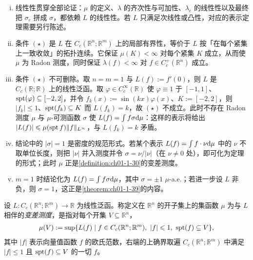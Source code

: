 \documentclass[../../main.tex]{subfiles}%
\begin{document}
\begin{remark}\label{remark:ch01-thm-1-38-条件}
\begin{enumerate}[(i)]
\item 线性性贯穿全部论证：$\mu$ 的定义、$\lambda$ 的齐次性与可加性、$\lambda_e$ 的线性性以及最终把 $\sigma_e$ 拼成 $\sigma$，都依赖 $L$ 的线性性。若 $L$ 只满足次线性或凸性，对应的表示定理需要另行陈述。
\item 条件 $(\star)$ 是 $L$ 在 $C_c(\mathbb{R}^n;\mathbb{R}^m)$ 上的局部有界性，等价于 $L$ 按「在每个紧集上一致收敛」的拓扑连续。它保证 $\mu(K)<\infty$ 对每个紧集 $K$ 成立，从而使 $\mu$ 为 Radon 测度，同时保证 $\lambda(f)<\infty$ 对 $f\in C_c^+(\mathbb{R}^n)$ 成立。
\item 条件 $(\star)$ 不可删除。取 $n=m=1$ 与 $L(f):=f'(0)$，则 $L$ 是 $C_c(\mathbb{R};\mathbb{R})$ 上的线性泛函。取 $\varphi\in C_c^{\infty}(\mathbb{R})$ 使 $\varphi\equiv1$ 于 $[-1,1]$、$\operatorname{spt}(\varphi)\subseteq[-2,2]$，并令 $f_k(x):=\sin(kx)\varphi(x)$、$K:=[-2,2]$，则 $\lvert f_k\rvert\leqslant1$、$\operatorname{spt}(f_k)\subseteq K$ 而 $L(f_k)=k$，故 $(\star)$ 不成立。此时不存在 Radon 测度 $\mu$ 与 $\mu$-可测函数 $\sigma$ 使 $L(f)=\int f\sigma\mathrm{d}\mu$：这样的表示将给出 $\lvert L(f)\rvert\leqslant\mu(\operatorname{spt} f)\lVert f\rVert_{L^{\infty}}$，与 $L(f_k)=k$ 矛盾。
\item 结论中的 $\lvert\sigma\rvert=1$ 是密度的规范形式。若某个表示 $L(f)=\int f\cdot\nu\mathrm{d}\mu$ 中的 $\nu$ 不取单位长度，则把 $\lvert\nu\rvert$ 并入测度并令 $\sigma=\nu/\lvert\nu\rvert$（在 $\nu\neq0$ 处），即可化为定理的形式；此时 $\mu$ 正是\cref{definition:ch01-1-30}的变差测度。%
\item $m=1$ 时结论化为 $L(f)=\int f\sigma\mathrm{d}\mu$，其中 $\sigma=\pm1$ $\mu$-a.e.；若进一步设 $L$ 非负，则 $\sigma=1$，这正是\cref{theorem:ch01-1-39}的内容。%
\end{enumerate}
\end{remark}

\begin{definition}[变差测度]\label{definition:ch01-1-30}
设 $L:C_c(\mathbb{R}^n;\mathbb{R}^m)\to\mathbb{R}$ 为线性泛函。称定义在 $\mathbb{R}^n$ 的开子集上的集函数 $\mu$ 为与 $L$ 相伴的\emph{变差测度}，是指对每个开集 $V\subseteq\mathbb{R}^n$，
\begin{align*}
\mu(V):=\sup\{L(f)\mid f\in C_c(\mathbb{R}^n;\mathbb{R}^m),\ \lvert f\rvert\leqslant1,\ \operatorname{spt}(f)\subseteq V\},
\end{align*}
其中 $\lvert f\rvert$ 表示向量值函数 $f$ 的欧氏范数，右端的上确界取遍 $C_c(\mathbb{R}^n;\mathbb{R}^m)$ 中满足 $\lvert f\rvert\leqslant1$ 且 $\operatorname{spt}(f)\subseteq V$ 的一切 $f$。
\end{definition}
\end{document}
